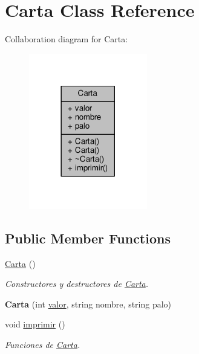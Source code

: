 \hypertarget{class_carta}{\section{Carta Class Reference}
\label{class_carta}
}


Collaboration diagram for Carta\+:
\nopagebreak
\begin{figure}[H]
\begin{center}
\leavevmode
\includegraphics[width=146pt]{class_carta__coll__graph}
\end{center}
\end{figure}
\subsection*{Public Member Functions}
\begin{DoxyCompactItemize}
\item 
\hypertarget{class_carta_a769e6bdb8d3725177481b32e4dbbbd66}{\hyperlink{class_carta_a769e6bdb8d3725177481b32e4dbbbd66}{Carta} ()}\label{class_carta_a769e6bdb8d3725177481b32e4dbbbd66}

\begin{DoxyCompactList}\small\item\em Constructores y destructores de \hyperlink{class_carta}{Carta}. \end{DoxyCompactList}\item 
\hypertarget{class_carta_a3b344c050b8fc2fdf04caf9577bdeda5}{{\bfseries Carta} (int \hyperlink{class_carta_a40ed698935c3b770a0b118dea14c667b}{valor}, string nombre, string palo)}\label{class_carta_a3b344c050b8fc2fdf04caf9577bdeda5}

\item 
\hypertarget{class_carta_a9a8f66923d83b66bf20289dc6e07874f}{void \hyperlink{class_carta_a9a8f66923d83b66bf20289dc6e07874f}{imprimir} ()}\label{class_carta_a9a8f66923d83b66bf20289dc6e07874f}

\begin{DoxyCompactList}\small\item\em Funciones de \hyperlink{class_carta}{Carta}. \end{DoxyCompactList}\end{DoxyCompactItemize}
